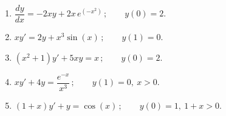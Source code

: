 \documentclass[10pt]{article}
\begin{document}
\begin{enumerate}[leftmargin=*, label=\numbox{\arabic*}, resume]

\item
    \begin{problem}[5cm]
        \(\dfrac{dy}{dx} = -2xy + 2x\,e^{(-x^2)}\,; \qquad y(0) = 2.\)
    \end{problem}

\item
    \begin{problem}[5cm]
        \(xy' = 2y + x^3 \sin(x)\,; \qquad y(1) = 0.\)
    \end{problem}

\item
    \begin{problem}[5cm]
        \((x^2 + 1)y' + 5xy = x\,; \qquad y(0) = 2.\)
    \end{problem}

\item
    \begin{problem}[5cm]
        \(xy' + 4y = \dfrac{e^{-x}}{x^3}\,; \qquad y(1) = 0,\ x > 0.\)
    \end{problem}

\item
    \begin{problem}[5cm]
        \((1 + x)y' + y = \cos(x)\,; \qquad y(0) = 1,\ 1 + x > 0.\)
    \end{problem}

\end{enumerate}
\end{document}
